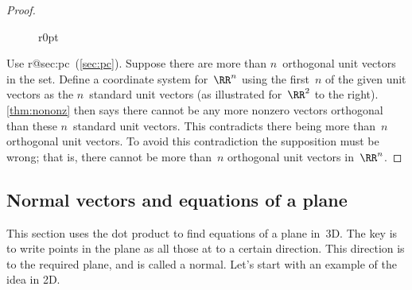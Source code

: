 \begin{proof} 
\begin{wrapfigure}r{0pt}
\end{wrapfigure}
Use %
\ifcsname r@sec:pc\endcsname\ (\cref{sec:pc})\fi.
Suppose there are more than \(n\)~orthogonal unit vectors in the set.
Define a coordinate system for~\(\RR^n\) using the first~\(n\) of the given unit vectors as the \(n\)~standard unit vectors 
(as illustrated for~\(\RR^2\) to the right).
\cref{thm:nononz} then says there cannot be any more nonzero vectors orthogonal than these \(n\)~standard unit vectors.
This contradicts there being more than~\(n\) orthogonal unit vectors.
To avoid this contradiction the supposition must be wrong; that is, there cannot be more than~\(n\) orthogonal unit vectors in~\(\RR^n\).
\par
\end{proof}








\subsection{Normal vectors and equations of a plane}
\label{sec:nvep}


This section uses the dot product to find equations of a plane in~3D.
The key is to write points in the plane as all those at  to a certain direction.  
This direction is  to the required plane, and is called a normal.
Let's start with an example of the idea in 2D.

